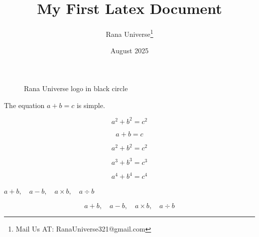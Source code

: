 \documentclass[12pt, letterpaper]{article}
\title{My First Latex Document}
\author{Rana Universe\thanks{Mail Us AT: RanaUniverse321@gmail.com}}
\date{August 2025}
\begin{document}
\maketitle






\begin{figure}[htbp]
\centering


\caption{Rana Universe logo in black circle}

\label{fig:rana-universe-logo}

\end{figure}



\newpage

The equation $a + b = c$ is simple.

\[ a^2 + b^2 = c^2\]


\begin{equation}
	a + b = c
\end{equation}

\begin{equation}
a^2 + b^2 = c^2
\end{equation}

\begin{equation}
	a^3 + b^3 = c^3
\end{equation}

\begin{equation}
a^4 + b^4 = c^4
\end{equation}

$
a + b,\quad a - b,\quad a \times b,\quad a \div b
$


\[
a + b,\quad a - b,\quad a \times b,\quad a \div b
\]
\end{document}
